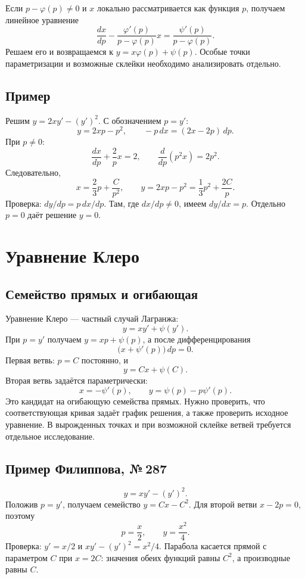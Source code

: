 \documentclass[12pt,a4paper]{article}
\begin{document}
Если $p-\varphi(p)\ne0$ и $x$ локально рассматривается как функция $p$, получаем линейное уравнение
\[
\frac{dx}{dp}
-\frac{\varphi'(p)}{p-\varphi(p)}x
=\frac{\psi'(p)}{p-\varphi(p)}.
\]
Решаем его и возвращаемся к $y=x\varphi(p)+\psi(p)$. Особые точки параметризации и возможные склейки необходимо анализировать отдельно.

\subsection{Пример}
Решим $y=2xy'-(y')^2$. С обозначением $p=y'$:
\[
y=2xp-p^2,\qquad -p\,dx=(2x-2p)\,dp.
\]
При $p\ne0$:
\[
\frac{dx}{dp}+\frac2p x=2,\qquad
\frac{d}{dp}(p^2x)=2p^2.
\]
Следовательно,
\[
x=\frac23p+\frac{C}{p^2},\qquad
y=2xp-p^2=\frac13p^2+\frac{2C}{p}.
\]
Проверка: $dy/dp=p\,dx/dp$. Там, где $dx/dp\ne0$, имеем $dy/dx=p$. Отдельно $p=0$ даёт решение $y=0$.

\section{Уравнение Клеро}
\subsection{Семейство прямых и огибающая}
Уравнение Клеро — частный случай Лагранжа:
\[
y=xy'+\psi(y').
\]
При $p=y'$ получаем $y=xp+\psi(p)$, а после дифференцирования
\[
\bigl(x+\psi'(p)\bigr)\,dp=0.
\]
Первая ветвь: $p=C$ постоянно, и
\[
\boxed{y=Cx+\psi(C).}
\]
Вторая ветвь задаётся параметрически:
\[
\boxed{x=-\psi'(p),\qquad
y=\psi(p)-p\psi'(p).}
\]
Это кандидат на огибающую семейства прямых. Нужно проверить, что соответствующая кривая задаёт график решения, а также проверить исходное уравнение. В вырожденных точках и при возможной склейке ветвей требуется отдельное исследование.

\subsection{Пример Филиппова, №\,287}
\[
y=xy'-(y')^2.
\]
Положив $p=y'$, получаем семейство $y=Cx-C^2$. Для второй ветви $x-2p=0$, поэтому
\[
p=\frac{x}{2},\qquad y=\frac{x^2}{4}.
\]
Проверка: $y'=x/2$ и $xy'-(y')^2=x^2/4$. Парабола касается прямой с параметром $C$ при $x=2C$: значения обеих функций равны $C^2$, а производные равны $C$.
\end{document}
